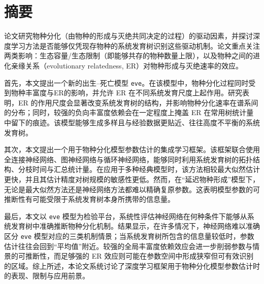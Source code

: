 \chapter*{摘要}

{\setlength{\parindent}{2em}
\noindent{}论文研究物种分化（由物种的形成与灭绝共同决定的过程）的驱动因素，并探讨深度学习方法是否能够仅凭现存物种的系统发育树识别这些驱动机制。论文重点关注两类影响：生态容量/生态限制（即能够共存的物种数量上限），以及物种之间的进化亲缘关系（evolutionary relatedness, ER）对物种形成与灭绝速率的效应。

首先，本文提出一个新的出生--死亡模型 \texttt{eve}。在该模型中，物种分化过程同时受到物种丰富度与ER的影响，并允许 ER 在不同系统发育尺度上起作用。研究表明，ER 的作用尺度会显著改变系统发育树的结构，并影响物种分化速率在谱系间的分布；同时，较强的负向丰富度依赖会在一定程度上掩盖 ER 在常用树统计量中留下的痕迹。该模型能够生成多样且与经验数据更贴近、往往高度不平衡的系统发育树。

其次，本文提出一个用于物种分化模型参数估计的集成学习框架。该框架联合使用全连接神经网络、图神经网络与循环神经网络，能够同时利用系统发育树的拓扑结构、分枝时间与汇总统计量。在应用于多种经典模型时，该方法相较最大似然估计更快，并且其估计精度对树规模的敏感性更低。然而，在“延迟物种形成”模型下，无论是最大似然方法还是神经网络方法都难以精确复原参数。这表明模型参数的可推断性有可能受限于系统发育树本身所携带的信息量。

最后，本文以 \texttt{eve} 模型为检验平台，系统性评估神经网络在何种条件下能够从系统发育树中准确推断物种分化机制。结果显示，在许多情况下，神经网络难以准确区分 \texttt{eve} 模型对应的三类机制情景；当系统发育树所包含的信息量较低时，参数估计往往会回到“平均值”附近。较强的全局丰富度依赖效应会进一步削弱参数与情景的可推断性，而足够强的 ER 效应则可能在参数空间中形成狭窄但可有效识别的区域。综上所述，本论文系统讨论了深度学习框架用于物种分化模型参数估计时的表现、限制与应用前景。
}